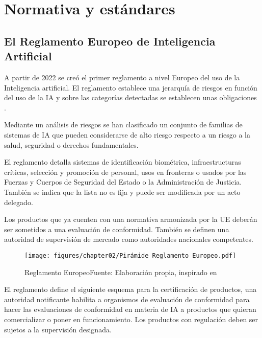 \section{Normativa y estándares}

\subsection{El Reglamento Europeo de Inteligencia Artificial}

A partir de 2022 se creó el primer reglamento a nivel Europeo del uso de la Inteligencia artificial. El reglamento establece una jerarquía de riesgos en función del uso de la \acrshort{IA} y sobre las categorías detectadas se establecen unas obligaciones \citet{El-Reglamento-Europeo-de-IA-en-resumen}.

Mediante un análisis de riesgos se han clasificado un conjunto de familias de sistemas de \acrshort{IA} que pueden considerarse de alto riesgo respecto a un riesgo a la salud, seguridad o derechos fundamentales.

El reglamento detalla sistemas de identificación biométrica, infraestructuras críticas, selección y promoción de personal, usos en fronteras o usados por las Fuerzas y Cuerpos de Seguridad del Estado o la Administración de Justicia. También se indica que la lista no es fija y puede ser modificada por un acto delegado.

Los productos que ya cuenten con una normativa armonizada por la \acrshort{UE} deberán ser sometidos a una evaluación de conformidad. También se definen una autoridad de supervisión de mercado como autoridades nacionales competentes.

\begin{figure}[H]
    \centering
    \texttt{[image: figures/chapter02/Pirámide Reglamento Europeo.pdf]}
    \caption{Reglamento Europeo\newline{}Fuente: Elaboración propia, inspirado en \cite{El-Reglamento-Europeo-de-IA-en-resumen,reglamento-ia-telefonica}}
    \label{fig:piramide-reglamento-europeo}
\end{figure}

El reglamento define el siguiente esquema para la certificación de productos, una autoridad notificante habilita a organismos de evaluación de conformidad para hacer las evaluaciones de conformidad en materia de \acrshort{IA} a productos que quieran comercializar o poner en funcionamiento. Los productos con regulación deben ser sujetos a la supervisión designada.

